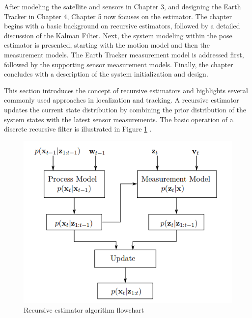 
\label{chap:stateestimation}

\label{sec:stateintro}

After modeling the satellite and sensors in Chapter 3, and designing the Earth Tracker in Chapter 4, Chapter 5 now focuses on the estimator. The chapter 
begins with a basic background on recursive estimators, followed by a detailed discussion of the Kalman Filter. Next, the system modeling within the pose estimator is 
presented, starting with the motion model and then the measurement models. The Earth Tracker measurement model is addressed first, followed by the supporting sensor 
measurement models. Finally, the chapter concludes with a description of the system initialization and design.

\label{sec:stateEKF}

This section introduces the concept of recursive estimators and highlights several commonly used approaches in localization and tracking. A recursive 
estimator updates the current state distribution by combining the prior distribution of the system states with the latest sensor measurements. The 
basic operation of a discrete recursive filter is illustrated in Figure \ref{fig:RE} \cite{Jiang}.

\begin{figure}[H]
    \centering
    \includegraphics[width=0.6\linewidth]{figures/StateEstimation/Recursive Estimation.png}
    \caption{Recursive estimator algorithm flowchart \cite{deJongh2019}}
    \label{fig:RE}
\end{figure}

